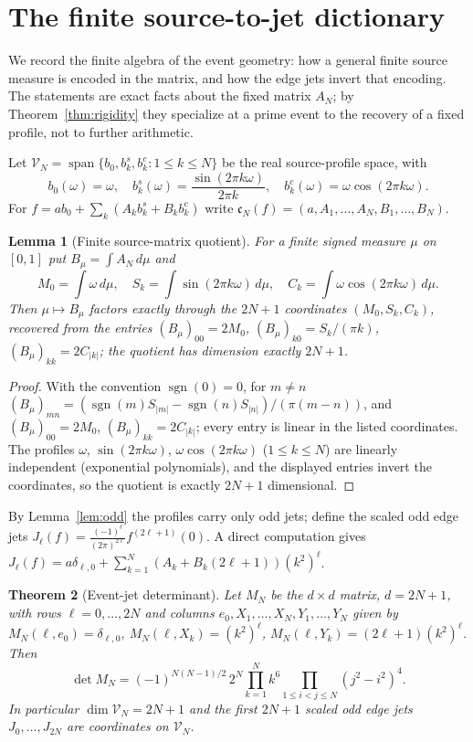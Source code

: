 \documentclass[11pt]{article}
\theoremstyle{plain}
\newtheorem{theorem}{Theorem}[section]
\newtheorem{lemma}[theorem]{Lemma}
\theoremstyle{definition}
\theoremstyle{remark}
\newcommand{\dd}{\,d}
\newcommand{\sgn}{\operatorname{sgn}}
\begin{document}
\section{The finite source-to-jet dictionary}\label{sec:dictionary}

We record the finite algebra of the event geometry: how a general finite source
measure is encoded in the matrix, and how the edge jets invert that encoding.
The statements are exact facts about the fixed matrix $A_N$; by
Theorem~\ref{thm:rigidity} they specialize at a prime event to the recovery of a
fixed profile, not to further arithmetic.

Let $\mathcal V_N=\operatorname{span}\{b_0,b_k^s,b_k^c:1\le k\le N\}$ be the real
source-profile space, with
\[
 b_0(\omega)=\omega,\quad
 b_k^s(\omega)=\frac{\sin(2\pi k\omega)}{2\pi k},\quad
 b_k^c(\omega)=\omega\cos(2\pi k\omega).
\]
For $f=a b_0+\sum_k(A_kb_k^s+B_kb_k^c)$ write
$\mathfrak c_N(f)=(a,A_1,\dots,A_N,B_1,\dots,B_N)$.

\begin{lemma}[Finite source-matrix quotient]\label{lem:quotient}
For a finite signed measure $\mu$ on $[0,1]$ put $B_\mu=\int A_N\dd\mu$ and
\[
 M_0=\int\omega\dd\mu,\quad S_k=\int\sin(2\pi k\omega)\dd\mu,\quad
 C_k=\int\omega\cos(2\pi k\omega)\dd\mu.
\]
Then $\mu\mapsto B_\mu$ factors exactly through the $2N+1$ coordinates
$(M_0,S_k,C_k)$, recovered from the entries
$(B_\mu)_{00}=2M_0$, $(B_\mu)_{k0}=S_k/(\pi k)$, $(B_\mu)_{kk}=2C_{|k|}$; the
quotient has dimension exactly $2N+1$.
\end{lemma}

\begin{proof}
With the convention $\sgn(0)=0$, for $m\ne n$
$(B_\mu)_{mn}=(\sgn(m)S_{|m|}-\sgn(n)S_{|n|})/(\pi(m-n))$, and
$(B_\mu)_{00}=2M_0$, $(B_\mu)_{kk}=2C_{|k|}$; every entry is linear in the listed
coordinates. The profiles $\omega$, $\sin(2\pi k\omega)$,
$\omega\cos(2\pi k\omega)$ ($1\le k\le N$) are linearly independent (exponential
polynomials), and the displayed entries invert the coordinates, so the quotient
is exactly $2N+1$ dimensional.
\end{proof}

By Lemma~\ref{lem:odd} the profiles carry only odd jets; define the scaled odd
edge jets $J_\ell(f)=\frac{(-1)^\ell}{(2\pi)^{2\ell}}f^{(2\ell+1)}(0)$. A direct
computation gives $J_\ell(f)=a\delta_{\ell,0}+\sum_{k=1}^N(A_k+B_k(2\ell+1))(k^2)^\ell$.

\begin{theorem}[Event-jet determinant]\label{thm:det}
Let $M_N$ be the $d\times d$ matrix, $d=2N+1$, with rows $\ell=0,\dots,2N$ and
columns $e_0,X_1,\dots,X_N,Y_1,\dots,Y_N$ given by
$M_N(\ell,e_0)=\delta_{\ell,0}$, $M_N(\ell,X_k)=(k^2)^\ell$,
$M_N(\ell,Y_k)=(2\ell+1)(k^2)^\ell$. Then
\[
 \det M_N=(-1)^{N(N-1)/2}\,2^N\prod_{k=1}^N k^6
 \prod_{1\le i<j\le N}(j^2-i^2)^4 .
\]
In particular $\dim\mathcal V_N=2N+1$ and the first $2N+1$ scaled odd edge jets
$J_0,\dots,J_{2N}$ are coordinates on $\mathcal V_N$.
\end{theorem}
\end{document}
